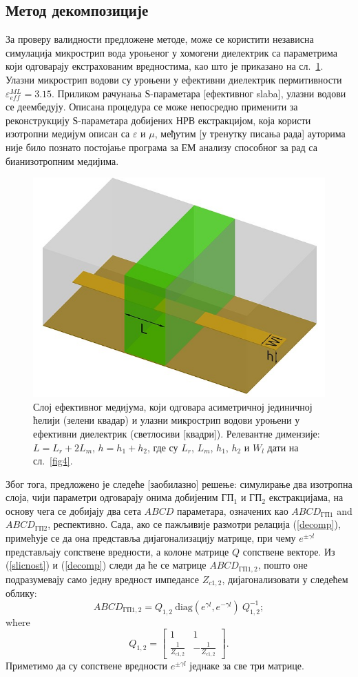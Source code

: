 \subsection{Метод декомпозиције}
За проверу валидности предложене методе, може се користити независна симулација микрострип вода уроњеног у хомогени диелектрик са параметрима који одговарају екстрахованим вредностима, као што је приказано на сл.~\ref{slab}. Улазни микрострип водови су уроњени у ефективни диелектрик пермитивности $\varepsilon^{ML}_{eff}=3.15$. Приликом рачунања $Ѕ$-параметара [ефективног slaba], улазни водови се деембедују. Описана процедура се може непосредно применити за реконструкцију $Ѕ$-параметара добијених НРВ екстракцијом, која користи изотропни медијум описан са $\varepsilon$ и $\mu$, међутим [у тренутку писања рада] ауторима није било познато постојање програма за ЕМ анализу способног за рад са бианизотропним медијима.
\begin{figure}[!t]
\centering
\includegraphics[width=0.6\columnwidth]{slike/slab.jpeg}
\caption{Слој ефективног медијума, који одговара асиметричној јединичној ћелији (зелени квадар) и улазни микрострип водови уроњени у ефективни диелектрик (светлосиви [квадри]). Релевантне димензије: $L=L_r+2L_m$, $h=h_1+h_2$, где су $L_r$, $L_m$, $h_1$, $h_2$ и $W_l$ дати на сл.~\ref{fig4}.}
\label{slab}
\end{figure}

Због тога, предложено је следеће [заобилазно] решење: симулирање два изотропна слоја, чији параметри одговарају онима добијеним $ГП_1$ и $ГП_2$ екстракцијама, на основу чега се добијају два сета $ABCD$ параметара, означених као $ABCD_{ГП1}$ and $ABCD_{ГП2}$, респективно. Сада, ако се пажљивије размотри релација (\ref{decomp}), примећује се да она представља дијагонализацију матрице, при чему $e^{\pm \gamma l}$ представљају сопствене вредности, а колоне матрице $Q$ сопствене векторе. Из (\ref{slicnost}) и (\ref{decomp}) следи да ће се матрице $ABCD_{ГП1,2}$, пошто оне подразумевају само једну вредност импедансе $Z_{c1,2}$, дијагонализовати у следећем облику:
\begin{equation}\label{decomp2}
ABCD_{ГП1,2} = Q_{1,2}\: \mathrm{diag}(e^{\gamma l},e^{-\gamma l})\: Q_{1,2}^{-1};
\end{equation}
where
\begin{equation}
Q_{1,2} = 
\begin{bmatrix}
1 & 1 \\
\frac{1}{Z_{c1,2}} & -\frac{1}{Z_{c1,2}}
\end{bmatrix}.
\end{equation}
Приметимо да су сопствене вредности $e^{\pm \gamma l}$ једнаке за све три матрице.

